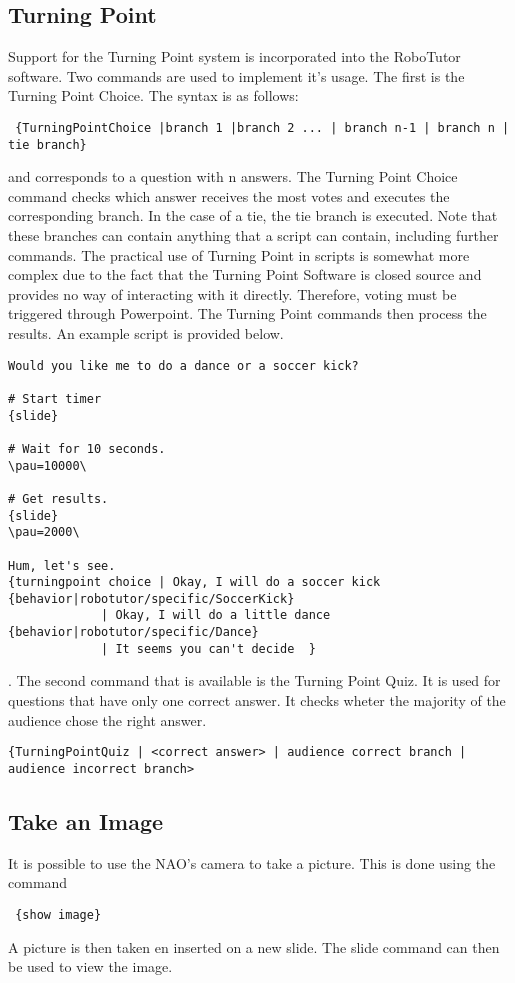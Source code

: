 \subsection{Turning Point}
Support for the Turning Point system is incorporated into the RoboTutor software. Two commands are used to implement it's usage. The first is the Turning Point Choice. The syntax is as follows: \begin{verbatim} {TurningPointChoice |branch 1 |branch 2 ... | branch n-1 | branch n | tie branch} \end{verbatim} and corresponds to a question with n answers. The Turning Point Choice command checks which answer receives the most votes and executes the corresponding branch. In the case of a tie, the tie branch is executed. Note that these branches can contain anything that a script can contain, including further commands.
The practical use of Turning Point in scripts is somewhat more complex due to the fact that the Turning Point Software is closed source and provides no way of interacting with it directly. Therefore, voting must be triggered through Powerpoint. The Turning Point commands then process the results. An example script is provided below.
\begin{verbatim}
Would you like me to do a dance or a soccer kick?

# Start timer
{slide}

# Wait for 10 seconds.
\pau=10000\

# Get results.
{slide}
\pau=2000\

Hum, let's see.
{turningpoint choice | Okay, I will do a soccer kick {behavior|robotutor/specific/SoccerKick}
			 | Okay, I will do a little dance {behavior|robotutor/specific/Dance}
			 | It seems you can't decide  }
\end{verbatim}
.
The second command that is available is the Turning Point Quiz. It is used for questions that have only one correct answer. It checks wheter the majority of the audience chose the right answer.
\begin{verbatim} 
{TurningPointQuiz | <correct answer> | audience correct branch | audience incorrect branch>
\end{verbatim}

\subsection{Take an Image}
It is possible to use the NAO's camera to take a picture. This is done using the command \begin{verbatim} {show image} \end{verbatim} 
A picture is then taken en inserted on a new slide. The slide command can then be used to view the image.


